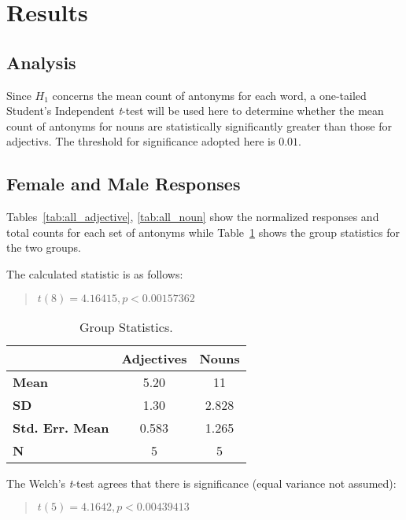 \section {Results}
\label{results}
\subsection {Analysis} 
Since $H_{1}$ concerns the mean count of antonyms for each word, a one-tailed Student's Independent \textit{t}-test will be used here to determine whether the mean count of antonyms for nouns are statistically significantly greater than those for adjectivs.  The threshold for significance adopted here is $0.01$.

\subsection{Female and Male Responses}
Tables~\ref{tab:all_adjective}, \ref{tab:all_noun} show the normalized responses and total counts for each set of antonyms while Table~\ref{tab:all_group_stats} shows the group statistics for the two groups.




The calculated statistic is as follows:
	\begin{quote}
		$t(8)=4.16415, p < 0.00157362$
	\end{quote}

\begin{table}
	\begin{center}
		\begin{tabular}{|l|c|c|} \hline
									& \textbf{Adjectives} 	& \textbf{Nouns}  \\ \hline \hline
			\textbf{Mean} 			& 5.20					& 11	\\
			\textbf{SD} 			& 1.30					& 2.828	\\
			\textbf{Std. Err. Mean} & 0.583					& 1.265	\\
			\textbf{N} 				& 5						& 5		\\
			\hline
		\end{tabular}
	\end{center}
	\caption {Group Statistics.}
	\label{tab:all_group_stats}
\end{table}


The Welch's \textit{t}-test agrees that there is significance (equal variance not assumed):
	\begin{quote}
		$t(5)=4.1642, p < 0.00439413$
	\end{quote}


